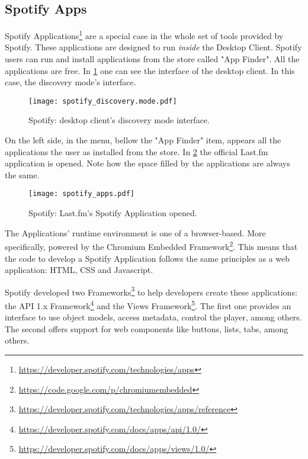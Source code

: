     \subsection{Spotify Apps} %
    \label{sub:spotify_apps}
      Spotify Applications\footnote{\url{https://developer.spotify.com/technologies/apps}} are a special case in the whole set of tools provided by Spotify.
      These applications are designed to run \emph{inside} the Desktop Client.
      Spotify users can run and install applications from the store called "App Finder".
      All the applications are free.
      In \ref{fig:spotify_apps} one can see the interface of the desktop client.
      In this case, the discovery mode's interface.
      \begin{figure}
        \begin{center}
          \texttt{[image: spotify\_discovery.mode.pdf]}
        \end{center}
        \caption{Spotify: desktop client's discovery mode interface.}
        \label{fig:spotify_apps}
      \end{figure}
      On the left side, in the menu, bellow the "App Finder" item, appears all the applications the user as installed from the store.
      In \ref{fig:spotify_apps2} the official Last.fm application is opened.
      Note how the space filled by the applications are always the same.

      \begin{figure}
        \begin{center}
          \texttt{[image: spotify\_apps.pdf]}
        \end{center}
        \caption{Spotify: Last.fm's Spotify Application opened.}
        \label{fig:spotify_apps2}
      \end{figure}

      The Applications' runtime environment is one of a browser-based.
      More specifically, powered by the Chromium Embedded Framework\footnote{\url{https://code.google.com/p/chromiumembedded}}.
      This means that the code to develop a Spotify Application follows the same principles as a web application: HTML, CSS and Javascript.

      Spotify developed two Frameworks\footnote{\url{https://developer.spotify.com/technologies/apps/reference}} to help developers create these applications: the API 1.x Framework\footnote{\url{https://developer.spotify.com/docs/apps/api/1.0/}} and the Views Framework\footnote{\url{https://developer.spotify.com/docs/apps/views/1.0/}}.
      The first one provides an interface to use object models, access metadata, control the player, among others.
      The second offers support for web components like buttons, lists, tabs, among others.

